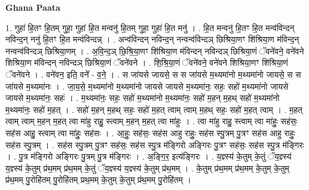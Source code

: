 \documentclass[17pt]{extarticle}
\begin{document}
\textbf{Ghana Paata } \newline

1. गुहा॑ हि॒तꣳ हि॒तम् गुहा॒ गुहा॑ हि॒त मन्वनु॑ हि॒तम् गुहा॒ गुहा॑ हि॒त मनु॑ । . हि॒त मन्वनु॑ हि॒तꣳ हि॒त मन्व॑विन्दन् नविन्द॒न् ननु॑ हि॒तꣳ हि॒त मन्व॑विन्दन्न् । . अन्व॑विन्दन् नविन्द॒न् नन्वन्व॑विन्दञ् छिश्रिया॒णꣳ शि॑श्रिया॒ण म॑विन्द॒न् नन्वन्व॑विन्दञ् छिश्रिया॒णम् । . अ॒वि॒न्द॒ञ् छि॒श्रि॒या॒णꣳ शि॑श्रिया॒ण म॑विन्दन् नविन्दञ् छिश्रिया॒णं ॅवने॑वने॒ वने॑वने शिश्रिया॒ण म॑विन्दन् नविन्दञ् छिश्रिया॒णं ॅवने॑वने । . शि॒श्रि॒या॒णं ॅवने॑वने॒ वने॑वने शिश्रिया॒णꣳ शि॑श्रिया॒णं ॅवने॑वने । . वने॑वन॒ इति॒ वने᳚ - व॒ने॒ । . स जा॑यसे जायसे॒ स स जा॑यसे म॒थ्यमा॑नो म॒थ्यमा॑नो जायसे॒ स स जा॑यसे म॒थ्यमा॑नः । . जा॒य॒से॒ म॒थ्यमा॑नो म॒थ्यमा॑नो जायसे जायसे म॒थ्यमा॑नः॒ सहः॒ सहो॑ म॒थ्यमा॑नो जायसे जायसे म॒थ्यमा॑नः॒ सहः॑ । . म॒थ्यमा॑नः॒ सहः॒ सहो॑ म॒थ्यमा॑नो म॒थ्यमा॑नः॒ सहो॑ म॒हन् म॒हथ् सहो॑ म॒थ्यमा॑नो म॒थ्यमा॑नः॒ सहो॑ म॒हत् । . सहो॑ म॒हन् म॒हथ् सहः॒ सहो॑ म॒हत् त्वाम् त्वाम् म॒हथ् सहः॒ सहो॑ म॒हत् त्वाम् । . म॒हत् त्वाम् त्वाम् म॒हन् म॒हत् त्वा मा॑हु राहु॒ स्त्वाम् म॒हन् म॒हत् त्वा मा॑हुः । . त्वा मा॑हु राहु॒ स्त्वाम् त्वा मा॑हुः॒ सह॑सः॒ सह॑स आहु॒ स्त्वाम् त्वा मा॑हुः॒ सह॑सः । . आ॒हुः॒ सह॑सः॒ सह॑स आहु राहुः॒ सह॑स स्पु॒त्रम् पु॒त्रꣳ सह॑स आहु राहुः॒ सह॑स स्पु॒त्रम् । . सह॑स स्पु॒त्रम् पु॒त्रꣳ सह॑सः॒ सह॑स स्पु॒त्र म॑ङ्गिरो अङ्गिरः पु॒त्रꣳ सह॑सः॒ सह॑स स्पु॒त्र म॑ङ्गिरः । . पु॒त्र म॑ङ्गिरो अङ्गिरः पु॒त्रम् पु॒त्र म॑ङ्गिरः । . अ॒ङ्गि॒र॒ इत्य॑ङ्गिरः । . य॒ज्ञ्स्य॑ के॒तुम् के॒तुं ॅय॒ज्ञ्स्य॑ य॒ज्ञ्स्य॑ के॒तुम् प्र॑थ॒मम् प्र॑थ॒मम् के॒तुं ॅय॒ज्ञ्स्य॑ य॒ज्ञ्स्य॑ के॒तुम् प्र॑थ॒मम् । . के॒तुम् प्र॑थ॒मम् प्र॑थ॒मम् के॒तुम् के॒तुम् प्र॑थ॒मम् पु॒रोहि॑तम् पु॒रोहि॑तम् प्रथ॒मम् के॒तुम् के॒तुम् प्र॑थ॒मम् पु॒रोहि॑तम् । \newline
\end{document}
